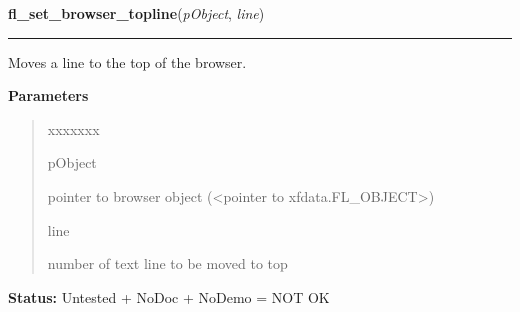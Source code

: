 \hspace{.8\funcindent}\begin{boxedminipage}{\funcwidth}

    \raggedright \textbf{fl\_set\_browser\_topline}(\textit{pObject}, \textit{line})

    \vspace{-1.5ex}

    \rule{\textwidth}{0.5\fboxrule}
\setlength{\parskip}{2ex}
    Moves a line to the top of the browser.

\setlength{\parskip}{1ex}
      \textbf{Parameters}
      \vspace{-1ex}

      \begin{quote}
        \begin{Ventry}{xxxxxxx}

          \item[pObject]

          pointer to browser object ({\textless}pointer to 
          xfdata.FL\_OBJECT{\textgreater})

          \item[line]

          number of text line to be moved to top

        \end{Ventry}

      \end{quote}

\textbf{Status:} Untested + NoDoc + NoDemo = NOT OK



    \end{boxedminipage}

    \label{xformslib:library:fl_set_browser_bottomline}

    \vspace{0.5ex}

